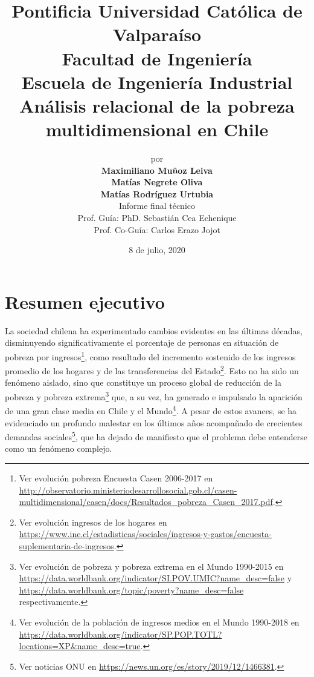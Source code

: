 \documentclass[12pt,letterpaper,spanish]{article}
\title{
Pontificia Universidad Católica de Valparaíso\\
Facultad de Ingeniería\\
Escuela de Ingeniería Industrial\vspace{3em}\\
\textbf{Análisis relacional de la pobreza multidimensional en Chile}} %
\author{\LARGE{por}\vspace{1em}\\
\textbf{\LARGE{Maximiliano Muñoz Leiva}}\vspace{1.5mm}\\
\textbf{\LARGE{Matías Negrete Oliva}}\vspace{1.5mm}\\
\textbf{\LARGE{Matías Rodríguez Urtubia}}\vspace{3em}\\
\LARGE{Informe final técnico}\vspace{2em}\\
\LARGE{Prof. Guía: PhD. Sebastián Cea Echenique}\vspace{1em}\\
\LARGE{Prof. Co-Guía: Carlos Erazo Jojot}\vspace{3em}}
\date{\LARGE{8 de julio, 2020}}
\begin{document}
\setcounter{tocdepth}{4}
\setcounter{secnumdepth}{4}

\renewcommand{\listtablename}{Lista de Tablas}%
\renewcommand{\listfigurename}{Lista de Figuras} %

\maketitle
\thispagestyle{empty}
\pagestyle{fancy}
\setlength{\parindent}{1cm} %
\setlength{\parskip}{1em}
\newpage
\begin{center}%
\tableofcontents
\clearpage
\listoffigures
\clearpage
\glsaddall
\glsaddallunused
\printglossary[type=main]
\clearpage
\end{center}%

\section*{Resumen ejecutivo} %
La sociedad chilena ha experimentado cambios evidentes en las últimas décadas, disminuyendo significativamente el porcentaje de personas en situación de pobreza por ingresos\footnote{Ver evolución pobreza Encuesta Casen 2006-2017 en \url{http://observatorio.ministeriodesarrollosocial.gob.cl/casen-multidimensional/casen/docs/Resultados_pobreza_Casen_2017.pdf}.}, como resultado del incremento sostenido de los ingresos promedio de los hogares y de las transferencias del Estado\footnote{Ver evolución ingresos de los hogares en \url{https://www.ine.cl/estadisticas/sociales/ingresos-y-gastos/encuesta-suplementaria-de-ingresos}.}. Esto no ha sido un fenómeno aislado, sino que constituye un proceso global de reducción de la pobreza y pobreza extrema\footnote{Ver evolución de pobreza y pobreza extrema en el Mundo 1990-2015 en \url{https://data.worldbank.org/indicator/SI.POV.UMIC?name_desc=false} y \url{https://data.worldbank.org/topic/poverty?name_desc=false} respectivamente.} que, a su vez, ha generado e impulsado la aparición de una gran clase media en Chile \cite{Candia2017RadiografiaPublica} y el Mundo\footnote{Ver evolución de la población de ingresos medios en el Mundo 1990-2018 en \url{https://data.worldbank.org/indicator/SP.POP.TOTL?locations=XP&name_desc=true}.}. A pesar de estos avances, se ha evidenciado un profundo malestar en los últimos años acompañado de crecientes demandas sociales\footnote{Ver noticias ONU en \url{https://news.un.org/es/story/2019/12/1466381}.}, que ha dejado de manifiesto que el problema debe entenderse como un fenómeno complejo.  
\end{document}
